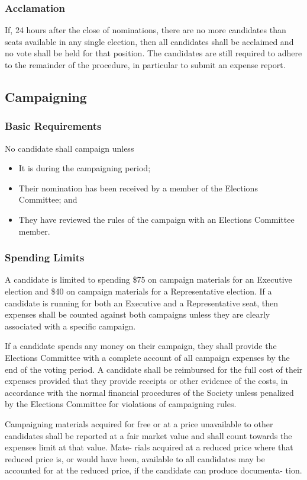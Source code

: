 \subsubsection{Acclamation}
If, 24 hours after the close of nominations, there are no more candidates than
seats available in any single election, then all candidates shall be acclaimed
and no vote shall be held for that position. The candidates are still required
to adhere to the remainder of the procedure, in particular to submit an expense
report.

\subsection{Campaigning}
\subsubsection{Basic Requirements}
No candidate shall campaign unless
\begin{itemize}
\item It is during the campaigning period;
\item Their nomination has been received by a member of the Elections Committee;
and
\item They have reviewed the rules of the campaign with an Elections Committee
member.
\end{itemize}

\subsubsection{Spending Limits}
A candidate is limited to spending \$75 on campaign materials for an Executive
election and \$40 on campaign materials for a Representative election. If a
candidate is running for both an Executive and a Representative seat, then
expenses shall be counted against both campaigns unless they are clearly
associated with a specific campaign.

If a candidate spends any money on their campaign, they shall provide the
Elections Committee with a complete account of all campaign expenses by the end
of the voting period. A candidate shall be reimbursed for the full cost of their
expenses provided that they provide receipts or other evidence of the costs, in
accordance with the normal financial procedures of the Society unless penalized by the 
Elections Committee for violations of campaigning rules.

Campaigning materials acquired for free or at a price unavailable to other
candidates shall be reported at a fair market value and shall count towards the
expenses limit at that value. Mate- rials acquired at a reduced price where that
reduced price is, or would have been, available to all candidates may be
accounted for at the reduced price, if the candidate can produce documenta-
tion.

